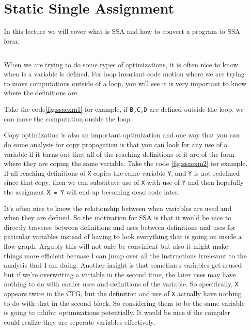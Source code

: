 \section{Static Single Assignment}

In this lecture we will cover what is SSA and how to convert a program to SSA form.

\subsection{}

When we are trying to do some types of optimizations, it is often nice to know when is a variable is defined.
For loop invariant code motion where we are trying to move computations outside of a loop, you will see it is very important to 
know where the definitions are.



Take the code\ref{fig:ssaexm1} for example, if \texttt{B,C,D} are defined outside the loop, we can move the computation ouside the loop.



Copy optimization is also an important optimization and one way that you can do some analysis for copy propogation is that you can 
look for any use of a variable if it turns out that all of the reaching definitions of it are of the form where they are coping the same 
variable. Take the code \ref{fig:ssaexm2} for example. If all reaching definitions of \texttt{X} copies the same variable \texttt{Y}, and \texttt{Y} is not 
redefined since that copy, then we can substitute use of \texttt{X} with use of \texttt{Y} and then hopefully the assigment \texttt{X = Y} will end up becoming dead code later.

It's often nice to know the relationship between when variables are used and when they are defined. So the motivation for SSA is that it would be nice to directly traverse between definitions and uses 
between definitions and uses for paticular variables instead of having to look everything that is going on inside a flow graph. Argubly this will not only be convinient but also it might make things more efficient becuase I 
can jump over all the instructions irrelevant to the analysis that I am doing. Another insight is that sometimes variables get reused but if we're overwriting a variable in the second time, the later 
uses may have nothing to do with earlier uses and definitions of the variable. So specifically, \texttt{X} appears twice in the CFG, but the definition and use of \texttt{X} actually have nothing to do with that in the second block.
So considering them to be the same variable is going to inhibit optimizations potentially. It would be nice if the compiler could realize they are seperate variables effectively.


